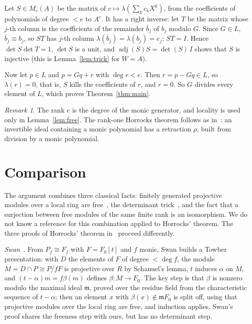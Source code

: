 \documentclass[11pt]{amsart}
\theoremstyle{remark}
\newtheorem{remark}[theorem]{Remark}
\begin{document}
Let $S\in M_e(A)$ be the matrix of $c\mapsto\lambda(\sum_kc_kX^k)$, from
the coefficients of polynomials of degree $<e$ to $A^e$. It has a right
inverse: let $T$ be the matrix whose $j$-th column is the coefficients of the
remainder $\bar b_j$ of $b_j$ modulo $G$. Since $G\in L$,
$\bar b_j\equiv b_j$, so $ST$ has $j$-th column $\lambda(\bar b_j)=\lambda(b_j)=e_j$:
$ST=I$. Hence $\det S\det T=1$, $\det S$ is a unit, and
$\operatorname{adj}(S)S=\det(S)\,I$ shows that $S$ is injective (this is
Lemma~\ref{lem:trick} for $W=A$).

Now let $p\in L$ and $p=Gq+r$ with $\deg r<e$. Then $r=p-Gq\in L$, so
$\lambda(r)=0$, that is, $S$ kills the coefficients of $r$, and $r=0$. So
$G$ divides every element of $L$, which proves Theorem~\ref{thm:main}.

\begin{remark}
The rank $e$ is the degree of the monic generator, and locality is used only
in Lemma~\ref{lem:free}. The rank-one Horrocks theorem follows as
in~\cite[\S4]{Div}: an invertible ideal containing a monic polynomial has a
retraction $\rho$, built from division by a monic polynomial.
\end{remark}

\section{Comparison}

The argument combines three classical facts: finitely generated projective
modules over a local ring are free~\cite{LQ}, the determinant
trick~\cite[Prop.~2.4]{AM}, and the fact that a surjection between free
modules of the same finite rank is an isomorphism. We do not know a
reference for this combination applied to Horrocks' theorem. The three
proofs of Horrocks' theorem in~\cite[Ch.~IV]{Lam} proceed differently.

\emph{Swan}~\cite[\S IV.3]{Lam}. From $P_f\cong F_f$ with $F=F_0[t]$ and
$f$ monic, Swan builds a Towber presentation: with $D$ the elements of $F$
of degree $<\deg f$, the module $M=D\cap P\cong P/fF$ is projective over $R$
by Schanuel's lemma, $t$ induces $\alpha$ on $M$, and $(t-\alpha)m=f\beta(m)$
defines $\beta:M\to F_0$. The key step is that $\beta$ is nonzero modulo the
maximal ideal $\mathfrak m$, proved over the residue field from the
characteristic sequence of $t-\alpha$; then an element $x$ with
$\beta(x)\notin\mathfrak mF_0$ is split off, using that projective modules
over the local ring are free, and induction applies. Swan's proof shares the
freeness step with ours, but has no determinant step.
\end{document}
